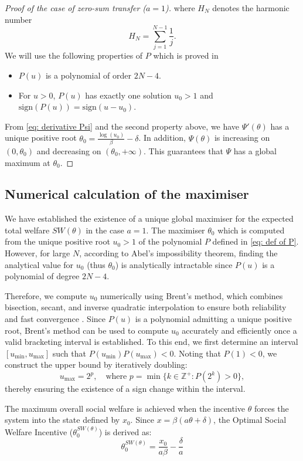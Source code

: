 \documentclass{article}
\begin{document}
\begin{proof}[Proof of the case of zero-sum transfer ($a=1$)]
where $H_N$ denotes the harmonic number
\[
H_N=\sum_{j=1}^{N-1}\frac{1}{j}.
\]
We will use the following properties of $P$ which is proved in  \cite[Proposition 1.6, supplementary document]{duonghan2021cost}
\begin{itemize}
    \item[(P1)] $P(u)$ is a polynomial of order $2N-4$.
    \item[(P2)] For $u > 0$, $P(u)$ has exactly one solution $u_0 > 1$ and $\textrm{sign}(P(u)) = \textrm{sign}(u - u_0)$.
\end{itemize}
From \eqref{eq: derivative Psi} and the second property above, we have $\Psi'(\theta)$ has a unique positive root $\theta_0 =\frac{\log(u_0)}{\beta}-\delta$. In addition, $\Psi(\theta)$ is increasing on $(0, \theta_0)$ and decreasing on $(\theta_0, +\infty)$. This guarantees that $\Psi$ has a global maximum at $\theta_0$. 
\end{proof}
\subsection*{Numerical calculation of the maximiser}
We have established the existence of a unique global maximiser for the expected total welfare $SW(\theta)$ in the case $a=1$. The maximiser $\theta_0$ which is computed from the unique positive root $u_0>1$ of the polynomial $P$ defined in \eqref{eq: def of P}. However, for large $N$, according to Abel's impossibility theorem, finding the analytical value for $u_0$ (thus $\theta_0$) is analytically intractable since $P(u)$ is a polynomial of degree $2N-4$.

Therefore, we compute $u_0$ numerically using Brent’s method, which combines bisection, secant, and inverse quadratic interpolation to ensure both reliability and fast convergence \cite{numericalrecipes}. Since $P(u)$ is a polynomial admitting a unique positive root, Brent’s method can be used to compute $u_0$ accurately and efficiently once a valid bracketing interval is established. To this end, we first determine an interval $[u_{\min}, u_{\max}]$ such that $P(u_{\min})P(u_{\max}) < 0$. Noting that $P(1) < 0$, we construct the upper bound by iteratively doubling:
\[
u_{\max} = 2^p,\quad \text{where } p = \min \{k \in \mathbb{Z}^+ : P(2^k) > 0\},
\]
thereby ensuring the existence of a sign change within the interval.

The maximum overall social welfare is achieved when the incentive $\theta$ forces the system into the state defined by $x_0$. Since $x = \beta(a\theta + \delta)$, the Optimal Social Welfare Incentive ($\theta_0^{SW(\theta)}$) is derived as:\[\theta_0^{SW(\theta)}=\dfrac{x_0}{a\beta}-\frac{\delta}{a}\]
\end{document}
